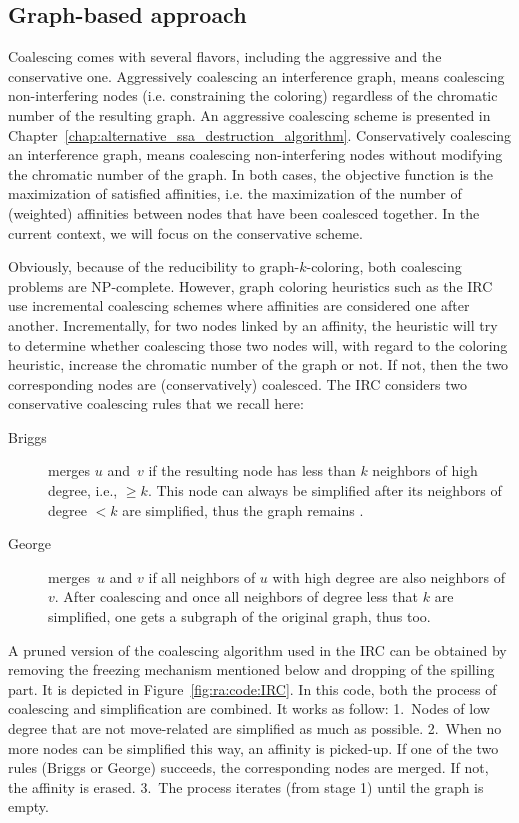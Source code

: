 {\subsection{Graph-based approach}
Coalescing comes with several flavors, including the aggressive and the conservative one.
Aggressively coalescing an interference graph, means coalescing non-interfering nodes (i.e. constraining the coloring) regardless of the chromatic number of the resulting graph. 
An aggressive coalescing scheme is presented in Chapter~\ref{chap:alternative_ssa_destruction_algorithm}.
Conservatively coalescing an interference graph, means coalescing non-interfering nodes without modifying the chromatic number of the graph.
In both cases, the objective function is the maximization of satisfied affinities, i.e. the maximization of the number of (weighted) affinities between nodes that have been coalesced together.
In the current context, we will focus on the conservative scheme.

Obviously, because of the reducibility to graph-$k$-coloring, both coalescing problems are NP-complete.
However, graph coloring heuristics such as the IRC use incremental coalescing schemes where affinities are considered one after another.
Incrementally, for two nodes linked by an affinity, the heuristic will try to determine whether coalescing those two nodes will, with regard to the coloring heuristic, increase the chromatic number of the graph or not.
If not, then the two corresponding nodes are (conservatively) coalesced.
The IRC considers two conservative coalescing rules that we recall here:
\begin{description}
  \item[Briggs] merges $u$ and~$v$ if the resulting node has 
    less than $k$ neighbors of high degree, i.e., $\geq k$. This node can 
    always be simplified after its neighbors of degree $<k$ are simplified, 
    thus the graph remains .

  \item[George] merges~$u$ and $v$ if all neighbors of $u$ with 
    high degree are also neighbors of $v$. After coalescing and once all 
    neighbors of degree less that $k$ are simplified, one gets a subgraph of 
    the original graph, thus  too.
\end{description}

A pruned version of the coalescing algorithm used in the IRC can be obtained by removing the freezing mechanism mentioned below and dropping of the spilling part.
It is depicted in Figure~\ref{fig:ra:code:IRC}.
In this code, both the process of coalescing and simplification are combined.
It works as follow:
1.~Nodes of low degree that are not move-related are simplified as much as possible.
2.~When no more nodes can be simplified this way, an affinity is picked-up. If one of the two rules (Briggs or George) succeeds, the corresponding nodes are merged. If not, the affinity is erased.
3.~The process iterates (from stage 1) until the graph is empty.


}
